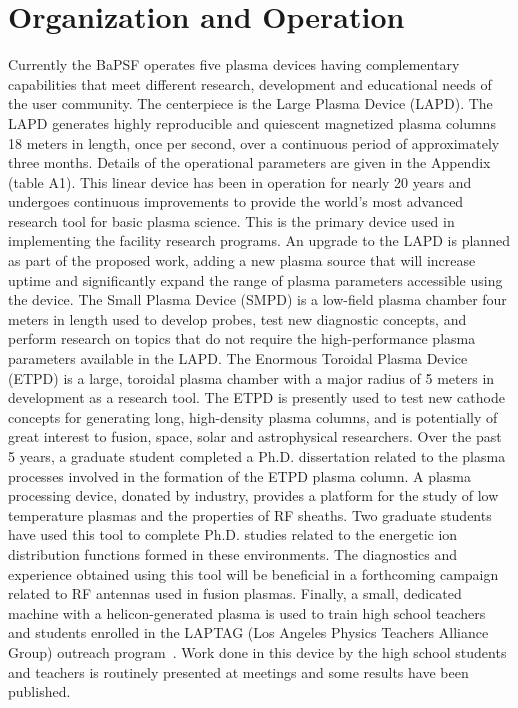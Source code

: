 \documentclass[11pt]{article}
\begin{document}
\section{Organization and Operation}

Currently the BaPSF operates five plasma devices having complementary
capabilities that meet different research, development and educational
needs of the user community. The centerpiece is the Large Plasma Device
(LAPD). The LAPD generates highly reproducible and quiescent magnetized
plasma columns 18 meters in length, once per second, over a continuous
period of approximately three months. Details of the operational parameters are given in the Appendix
(table A1). This linear device has been in operation for nearly 20 years
and undergoes continuous improvements to provide the world's
most advanced research tool for basic plasma science. This is the
primary device used in implementing
the facility research programs. An upgrade to the LAPD is planned as
part of the proposed work, adding a new plasma source that will increase
uptime and significantly expand the range of plasma parameters
accessible using the device. The Small Plasma Device (SMPD) is a
low-field plasma chamber four meters in length used to develop probes,
test new diagnostic concepts, and perform research on topics that do not
require the high-performance plasma parameters available in the LAPD.
The Enormous Toroidal Plasma Device (ETPD) is a large, toroidal plasma
chamber with a major radius of 5 meters in development as a research
tool. The ETPD is presently used to test new cathode concepts for
generating long, high-density plasma columns, and is potentially of
great interest to fusion, space, solar and astrophysical researchers.
Over the past 5 years, a graduate student completed a Ph.D.
dissertation related to the plasma processes involved in the formation
of the ETPD plasma column. A plasma processing device, donated by
industry, provides a platform for the study of low temperature plasmas
and the properties of RF sheaths. Two graduate students have used this
tool to complete Ph.D. studies related to the energetic ion distribution
functions formed in these environments. The diagnostics and experience
obtained using this tool will be beneficial in a forthcoming campaign
related to RF antennas used in fusion plasmas. Finally, a small,
dedicated machine with a helicon-generated plasma is used to train high
school teachers and students enrolled in the LAPTAG (Los Angeles
Physics Teachers Alliance Group) outreach program~\citep{laptag}.
Work done in this device by the high school students and teachers is
routinely presented at meetings and some results have been published.
\end{document}
